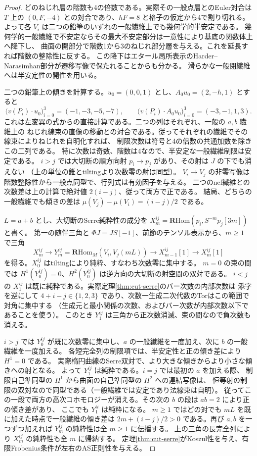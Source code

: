 \begin{proof}
どのねじれ層の階数も4の倍数である。実際その一般点層とのEuler対合は
$T$ 上の $(0,F,-4)$ との対合であり、$hF=8$ と格子の仮定から4で割り切れる。
よって各 $V_i$ は二つの鉛筆のいずれの一般繊維上でも幾何学的半安定である。
幾何学的一般繊維で不安定ならその最大不安定部分は一意性により基底の関数体上へ降下し、
曲面の開部分で階数1から3のねじれ部分層を与える。これを延長すれば階数の整除性に反する。
この降下はエタール局所表示のHarder--Narasimhan部分が遷移写像で保たれることからも分かる。
滑らかな一般閉繊維へは半安定性の開性を用いる。

二つの鉛筆上の傾きを計算する。$u_0=(0,0,1)$ とし、$A_0u_0=(2,-h,1)$ とすると
\[
 \big(v(P_i)\cdot u_0\big)_{i=0}^3=(-1,-3,-5,-7),\qquad
 \big(v(P_i)\cdot A_0u_0\big)_{i=0}^3=(-3,-1,1,3).
\]
これは左変異の式からの直接計算である。二つの列はそれぞれ、一般の $a,b$ 繊維上の
ねじれ線束の直像の移動との対合である。従ってそれぞれの繊維でその線束によりねじれを自明化すれば、
制限次数は符号と4の倍数の共通加数を除きこの二列である。
特に次数は奇数、階数は4なので、半安定な一般繊維制限は安定である。
$i>j$ では大切断の順方向射 $p_i\to p_j$ があり、その射は $J$ の下でも消えない
（上の単位の錐とtiltingより次数零の射は同型）。
$V_i\to V_j$ の非零写像は階数整除性から一般点同型で、行列式は有効因子を与える。
二つのnef繊維との次数差は上の計算で絶対値 $2(i-j)$、従って両方で正である。
結局、どちらの一般繊維でも傾きの差は $\mu(V_j)-\mu(V_i)=(i-j)/2$ である。

$L=a+b$ とし、大切断のSerre純粋性の成分を
$X_m^{ij}=\mathbf R\mathrm{Hom}(p_i,S^{-m}p_j[3m])$ と書く。
第一の随伴三角と $\Phi J=JS[-1]$、前節のテンソル表示から、$m\ge1$ で三角
\[
 X_m^{ij}\longrightarrow
 Y_m^{ij}=\mathbf R\mathrm{Hom}_M(V_i,V_j(mL))\longrightarrow X_{m-1}^{ij}[1]
 \longrightarrow X_m^{ij}[1]
\]
を得る。$X_0^{ij}$ はtiltingにより純粋、すなわち次数零に集中する。
$m=0$ の束の間では $H^1(Y_0^{ij})=0$、$H^2(Y_0^{ij})$ は逆方向の大切断の射空間の双対である。
$i<j$ の $X_1^{ij}$ は既に純粋である。実際定理\ref{thm:cut-serre}のバー次数の内部次数は
添字を逆にして $4+i-j\in\{1,2,3\}$ であり、次数一生成二次代数のTorはこの範囲で対角に集中する
（生成元と最小関係の次数、およびバー次数が内部次数以下であることを使う）。
このとき $Y_1^{ij}$ は三角から正次数消滅、束の間なので負次数も消える。

$i>j$ では $Y_0^{ij}$ が既に次数零に集中し、$a$ の一般繊維を一度加え、次に $b$ の一般繊維を一度加える。
各短完全列の制限項では、半安定性と正の傾き差により $H^1=0$ である。
実際楕円曲線のSerre双対で、より大きな傾きからより小さな傾きへの射となる。
よって $Y_1^{ij}$ は純粋である。$i=j$ では最初の $a$ を加える際、
制限自己準同型の $H^1$ から曲面の自己準同型の $H^2$ への連結写像は、
恒等射の制限の双対なので同型である（一般繊維では安定であり法線束は自明）。
従ってこの一段で両方の高次コホモロジーが消える。その次の $b$ の段は $ab=2$ により正の傾き差があり、
ここでも $Y_1^{ii}$ は純粋になる。
$m\ge1$ ではどの対でも $mL$ を既に加えた時点で一般繊維の傾き差は
$2m+(i-j)/2>0$ である。再び $a,b$ を一つずつ加えれば $Y_m^{ij}$ の純粋性は全 $m\ge1$ に伝播する。
上の三角の長完全列により $X_m^{ij}$ の純粋性も全 $m$ に帰納する。
定理\ref{thm:cut-serre}がKoszul性を与え、有限Frobenius条件が左右のAS正則性を与える。
\end{proof}
